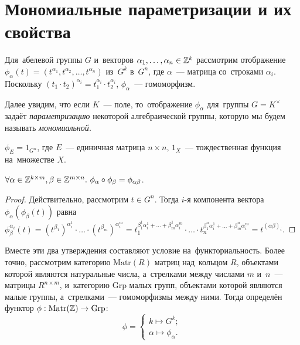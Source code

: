 \section{Мономиальные параметризации и их свойства}
Для~абелевой группы $G$ и~векторов $\alpha_1, \ldots, \alpha_n \in \mathbb{Z}^k$ рассмотрим отображение $\phi_\alpha(t) = (t^{\alpha_1}, t^{\alpha_2}, \ldots, t^{\alpha_n})$
из~$G^k$ в~$G^n$, где $\alpha$~— матрица со~строками $\alpha_i$. Поскольку $(t_1 \cdot t_2)^{\alpha_i} = t_1^{\alpha_i} \cdot t_2^{\alpha_i}$,
$\phi_\alpha$~— гомоморфизм.

Далее увидим, что если $K$~— поле, то~отображение $\phi_\alpha$ для~группы $G = K^\times$ задаёт \textit{параметризацию} некоторой алгебраической группы,
которую мы будем называть \textit{мономиальной.}

\begin{statement*}
  $\phi_{E} = 1_{G^n}$, где $E$~— единичная матрица $n \times n$, $1_X$~— тождественная функция на~множестве $X$.
\end{statement*}

\begin{statement*}
  $
    \forall \alpha \in \mathbb{Z}^{k \times m}, \beta \in \mathbb{Z}^{m \times n}.\ \phi_\alpha \circ \phi_\beta = \phi_{\alpha \beta}
  $.
\end{statement*}

\begin{proof}
  Действительно, рассмотрим $t \in G^n$. Тогда $i$-я компонента вектора $\phi_\alpha(\phi_\beta(t))$
  равна
  $ \phi_\beta^{\alpha_i}(t) = (t^{\beta_1})^{\alpha_i^1} \cdot \ldots \cdot (t^{\beta_m})^{\alpha_i^m}
                             = t_1^{\beta_1^1 \alpha_i^1 + \ldots + \beta_m^1 \alpha_i^m} \cdot
                               \ldots \cdot
                               t_n^{\beta_1^n \alpha_i^1 + \ldots + \beta_m^n \alpha_i^m}
                             = t^{(\alpha \beta)_i}.
  $
\end{proof}

Вместе эти два утверждения составляют условие на~функториальность. Более точно, рассмотрим категорию
$\mathrm{Matr}(R)$ матриц над~кольцом $R$, объектами которой являются натуральные числа, а~стрелками
между числами $m$ и~$n$~— матрицы $R^{n \times m}$, и~категорию $\mathrm{Grp}$ малых групп,
объектами которой являются малые группы, а~стрелками~— гомоморфизмы между ними.
Тогда определён функтор $\phi : \mathrm{Matr}(\mathbb{Z}) \rightarrow \mathrm{Grp}$:
\[
  \phi = \begin{cases}
    k \mapsto G^k; \\
    \alpha \mapsto \phi_\alpha.
  \end{cases}
\]

